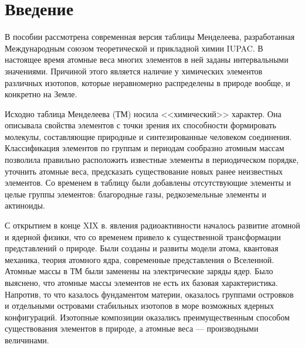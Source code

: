 \documentclass[a5paper,openany]{book}
\begin{document}
	
	\chapter*{Введение}
	
	
	В пособии рассмотрена современная версия таблицы Менделеева, разработанная Международным союзом теоретической и прикладной химии IUPAC. В настоящее время  атомные веса многих элементов в ней заданы интервальными значениями. Причиной этого является наличие у химических элементов различных изотопов, которые неравномерно распределены в природе вообще, и конкретно на Земле.
		
	Исходно таблица Менделеева (ТМ) носила <<химический>> характер. Она описывала свойства элементов с точки зрения их способности формировать молекулы, составляющие природные и синтезированные человеком соединения. Классификация элементов по группам и периодам сообразно атомным массам позволила правильно расположить известные элементы в периодическом порядке, уточнить атомные веса, предсказать существование новых ранее неизвестных элементов. 
	Со временем в таблицу были добавлены отсутствующие элементы и целые группы элементов: благородные газы, редкоземельные элементы и актиноиды. 
	
	С открытием в конце XIX в. явления радиоактивности началось развитие атомной и ядерной физики, что со временем привело к существенной трансформации представлений о природе. Были созданы и развиты модели атома, квантовая механика, теория атомного ядра, современные представления о Вселенной. Атомные массы в ТМ были заменены на электрические заряды ядер. Было выяснено, что атомные массы элементов не есть их базовая характеристика. Напротив, то что казалось фундаментом материи, оказалось группами островков и отдельными островами стабильных изотопов в море возможных ядерных конфигураций.  Изотопные композиции оказались преимущественным способом существования элементов в природе, а атомные веса --- производными величинами.
	
\end{document}

